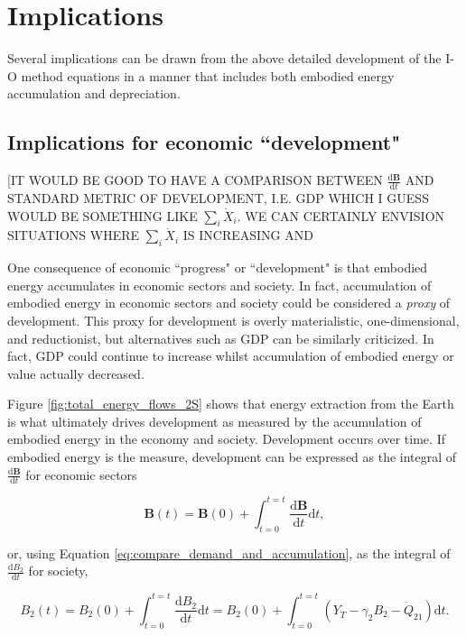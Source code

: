 \documentclass[authoryear,preprint,review,12pt]{elsarticle}
\renewcommand{\vec}[1]{\mathbf{#1}}
\begin{document}
\section{Implications}

Several implications can be drawn from the above detailed development of the I-O method equations in a manner that includes both embodied energy accumulation and depreciation.

\subsection{Implications for economic ``development"}

[IT WOULD BE GOOD TO HAVE A COMPARISON BETWEEN $\frac{\mathrm{d}\vec{B}}{\mathrm{d}t}$ AND STANDARD METRIC OF DEVELOPMENT, I.E. GDP WHICH I GUESS WOULD BE SOMETHING LIKE $\sum_{i}\dot{X}_{i}$. WE CAN CERTAINLY ENVISION SITUATIONS WHERE $\sum_{i}\dot{X}_{i}$ IS INCREASING AND 

One consequence of economic ``progress" or ``development" is that embodied energy accumulates in economic sectors and society. In fact, accumulation of embodied energy in economic sectors and society could be considered a \emph{proxy} of development. This proxy for development is overly materialistic, one-dimensional, and reductionist, but alternatives such as GDP can be similarly criticized. In fact, GDP could continue to increase whilst accumulation of embodied energy or value actually decreased.

Figure \ref{fig:total_energy_flows_2S} shows that energy extraction from the Earth is what ultimately drives development as measured by the accumulation of embodied energy in the economy and society. Development occurs over time. If embodied energy is the measure, development can be expressed as the integral of $\frac{\mathrm{d}\vec{B}}{\mathrm{d}t}$ for economic sectors

\begin{equation} \label{eq:Dev_Integral_Economy}
	\vec{B}(t) = \vec{B}(0) + \int_{t=0}^{t=t} \frac{\mathrm{d}\vec{B}}{\mathrm{d}t}\mathrm{d}t,
\end{equation}

\noindent or, using Equation \ref{eq:compare_demand_and_accumulation}, as the integral of $\frac{\mathrm{d}B_{2}}{\mathrm{d}t}$ for society,

\begin{equation} \label{eq:Dev_Integral_Society}
	B_{2}(t) = B_{2}(0) + \int_{t=0}^{t=t} \frac{\mathrm{d}B_{2}}{\mathrm{d}t}\mathrm{d}t = B_{2}(0) + \int_{t=0}^{t=t} (Y_{\dot{T}} - \gamma_{2}B_{2} - \dot{Q}_{21})\mathrm{d}t.
\end{equation}
\end{document}
